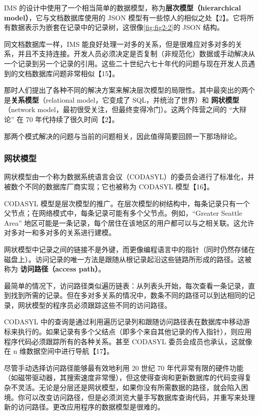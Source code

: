 IMS 的设计中使用了一个相当简单的数据模型，称为\textbf{层次模型（hierarchical model）}，它与文档数据库使用的 JSON 模型有一些惊人的相似之处【2】。它将所有数据表示为嵌套在记录中的记录树，这很像\autoref{fig:fig2-2}的 JSON 结构。

同文档数据库一样，IMS 能良好处理一对多的关系，但是很难应对多对多的关系，并且不支持连接。开发人员必须决定是否复制（非规范化）数据或手动解决从一个记录到另一个记录的引用。这些二十世纪六七十年代的问题与现在开发人员遇到的文档数据库问题非常相似【15】。

那时人们提出了各种不同的解决方案来解决层次模型的局限性。其中最突出的两个是\textbf{关系模型}（relational model，它变成了 SQL，并统治了世界）和 \textbf{网状模型}（network model，最初很受关注，但最终变得冷门）。这两个阵营之间的 “大辩论” 在 70 年代持续了很久时间【2】。

那两个模式解决的问题与当前的问题相关，因此值得简要回顾一下那场辩论。

\subsubsection{网状模型}

网状模型由一个称为数据系统语言会议（CODASYL）的委员会进行了标准化，并被数个不同的数据库厂商实现；它也被称为 CODASYL 模型【16】。

CODASYL 模型是层次模型的推广。在层次模型的树结构中，每条记录只有一个父节点；在网络模式中，每条记录可能有多个父节点。例如，“Greater Seattle Area” 地区可能是一条记录，每个居住在该地区的用户都可以与之相关联。这允许对多对一和多对多的关系进行建模。

网状模型中记录之间的链接不是外键，而更像编程语言中的指针（同时仍然存储在磁盘上）。访问记录的唯一方法是跟随从根记录起沿这些链路所形成的路径。这被称为 \textbf{访问路径（access path）}。

最简单的情况下，访问路径类似遍历链表：从列表头开始，每次查看一条记录，直到找到所需的记录。但在多对多关系的情况中，数条不同的路径可以到达相同的记录，网状模型的程序员必须跟踪这些不同的访问路径。

CODASYL 中的查询是通过利用遍历记录列和跟随访问路径表在数据库中移动游标来执行的。如果记录有多个父结点（即多个来自其他记录的传入指针），则应用程序代码必须跟踪所有的各种关系。甚至 CODASYL 委员会成员也承认，这就像在 n 维数据空间中进行导航【17】。

尽管手动选择访问路径能够最有效地利用 20 世纪 70 年代非常有限的硬件功能（如磁带驱动器，其搜索速度非常慢），但这使得查询和更新数据库的代码变得复杂不灵活。无论是分层还是网状模型，如果你没有所需数据的路径，就会陷入困境。你可以改变访问路径，但是必须浏览大量手写数据库查询代码，并重写来处理新的访问路径。更改应用程序的数据模型是很难的。

